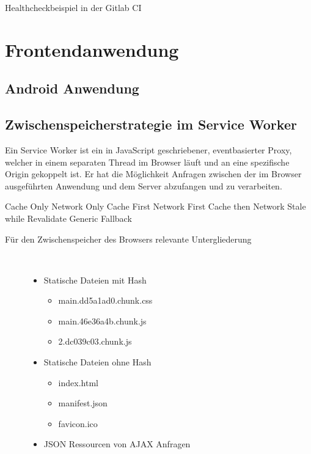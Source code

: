 \begin{listing}
    \label{lst:healthcheck}
    \inputminted{sh}{snippets/sh/healthcheck.sh}
    \caption{Healthcheckbeispiel in der Gitlab CI}
\end{listing}

\section{Frontendanwendung}
\label{sec:frontendanwendung}

\subsection{Android Anwendung}
\label{subec:androidanwendung}

\subsection{Zwischenspeicherstrategie im Service Worker}
\label{subsec:zwischenspeicherstrategieimserviceworker}
Ein Service Worker ist ein in JavaScript geschriebener,
eventbasierter Proxy, welcher in einem separaten Thread im Browser
läuft und an eine spezifische Origin gekoppelt ist. Er hat
die Möglichkeit Anfragen zwischen der im Browser ausgeführten
Anwendung und dem Server abzufangen und zu verarbeiten.

Cache Only
Network Only
Cache First
Network First
Cache then Network
Stale while Revalidate
Generic Fallback

\begin{description}
    \item[Für den Zwischenspeicher des Browsers relevante Untergliederung]~\par
    \begin{itemize}
       \item Statische Dateien mit Hash
       \begin{itemize}
            \item main.dd5a1ad0.chunk.css
            \item main.46e36a4b.chunk.js
            \item 2.dc039c03.chunk.js
       \end{itemize}
       \item Statische Dateien ohne Hash
       \begin{itemize}
            \item index.html
            \item manifest.json
            \item favicon.ico
       \end{itemize}
       \item JSON Ressourcen von AJAX Anfragen
    \end{itemize}
\end{description}

